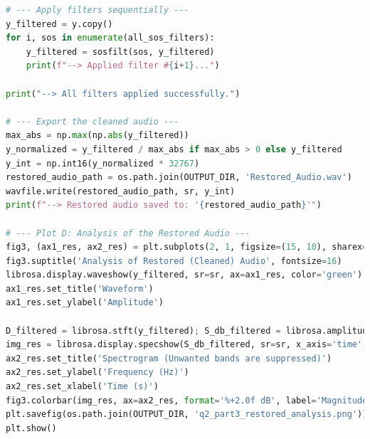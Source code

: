 \documentclass[11pt, a4paper]{article}
\begin{document}
\begin{lstlisting}[language=Python, caption={Python script for Question 2.}]
# --- Apply filters sequentially ---
y_filtered = y.copy()
for i, sos in enumerate(all_sos_filters):
    y_filtered = sosfilt(sos, y_filtered)
    print(f"--> Applied filter #{i+1}...")

print("--> All filters applied successfully.")

# --- Export the cleaned audio ---
max_abs = np.max(np.abs(y_filtered))
y_normalized = y_filtered / max_abs if max_abs > 0 else y_filtered
y_int = np.int16(y_normalized * 32767)
restored_audio_path = os.path.join(OUTPUT_DIR, 'Restored_Audio.wav')
wavfile.write(restored_audio_path, sr, y_int)
print(f"--> Restored audio saved to: '{restored_audio_path}'")

# --- Plot D: Analysis of the Restored Audio ---
fig3, (ax1_res, ax2_res) = plt.subplots(2, 1, figsize=(15, 10), sharex=True)
fig3.suptitle('Analysis of Restored (Cleaned) Audio', fontsize=16)
librosa.display.waveshow(y_filtered, sr=sr, ax=ax1_res, color='green')
ax1_res.set_title('Waveform')
ax1_res.set_ylabel('Amplitude')

D_filtered = librosa.stft(y_filtered); S_db_filtered = librosa.amplitude_to_db(np.abs(D_filtered), ref=np.max)
img_res = librosa.display.specshow(S_db_filtered, sr=sr, x_axis='time', y_axis='log', ax=ax2_res)
ax2_res.set_title('Spectrogram (Unwanted bands are suppressed)')
ax2_res.set_ylabel('Frequency (Hz)')
ax2_res.set_xlabel('Time (s)')
fig3.colorbar(img_res, ax=ax2_res, format='%+2.0f dB', label='Magnitude (dB)')
plt.savefig(os.path.join(OUTPUT_DIR, 'q2_part3_restored_analysis.png'))
plt.show()

\end{lstlisting}
\end{document}
